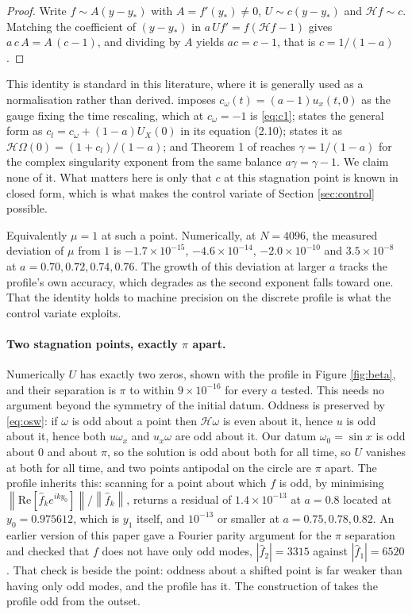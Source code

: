 \documentclass[11pt]{article}
\theoremstyle{definition}
\newcommand{\Hil}{\mathcal{H}}
\newcommand{\norm}[1]{\left\lVert #1 \right\rVert}
\newcommand{\abs}[1]{\left\lvert #1 \right\rvert}
\begin{document}
\begin{proof}
Write $f \sim A(y-y_\ast)$ with $A = f'(y_\ast)\ne 0$, $U \sim c(y-y_\ast)$ and
$\Hil f \sim c$. Matching the coefficient of $(y-y_\ast)$ in
$a\,Uf' = f(\Hil f - 1)$ gives $a\,c\,A = A\,(c-1)$, and dividing by $A$ yields
$ac = c-1$, that is $c=1/(1-a)$.
\end{proof}

This identity is standard in this literature, where it is generally used as a
normalisation rather than derived. \cite{chenS1} imposes
$c_\omega(t) = (a-1)u_x(t,0)$ as the gauge fixing the time rescaling, which at
$c_\omega=-1$ is \eqref{eq:c1}; \cite{htw2026} states the general form as
$c_l = c_\omega + (1-a)U_X(0)$ in its equation (2.10); \cite{xu2026} states it
as $\Hil\Omega(0)=(1+c_l)/(1-a)$; and Theorem 1 of \cite{lss2020} reaches
$\gamma = 1/(1-a)$ for the complex singularity exponent from the same balance
$a\gamma = \gamma-1$. We claim none of it. What matters here is only that $c$
at this stagnation point is known in closed form, which is what makes the
control variate of Section \ref{sec:control} possible.

Equivalently $\mu = 1$ at such a point. Numerically, at $N=4096$, the measured
deviation of $\mu$ from $1$ is $-1.7\times10^{-15}$, $-4.6\times10^{-14}$,
$-2.0\times10^{-10}$ and $3.5\times10^{-8}$ at $a=0.70,0.72,0.74,0.76$. The
growth of this deviation at larger $a$ tracks the profile's own accuracy, which
degrades as the second exponent falls toward one. That the identity holds to
machine precision on the discrete profile is what the control variate exploits.

\paragraph{Two stagnation points, exactly $\pi$ apart.} Numerically $U$ has
exactly two zeros, shown with the profile in Figure \ref{fig:beta}, and their
separation is $\pi$ to within $9\times10^{-16}$ for every $a$ tested. This
needs no argument beyond the symmetry of the initial datum. Oddness is
preserved by \eqref{eq:osw}: if $\omega$ is odd about a point then $\Hil\omega$
is even about it, hence $u$ is odd about it, hence both $u\omega_x$ and
$u_x\omega$ are odd about it. Our datum $\omega_0=\sin x$ is odd about $0$ and
about $\pi$, so the solution is odd about both for all time, so $U$ vanishes at
both for all time, and two points antipodal on the circle are $\pi$ apart. The
profile inherits this: scanning for a point about which $f$ is odd, by
minimising $\norm{\mathrm{Re}[\hat f_k e^{iky_0}]}/\norm{\hat f_k}$, returns a
residual of $1.4\times10^{-13}$ at $a=0.8$ located at $y_0=0.975612$, which is
$y_1$ itself, and $10^{-13}$ or smaller at $a=0.75,0.78,0.82$. An earlier
version of this paper gave a Fourier parity argument for the $\pi$ separation
and checked that $f$ does not have only odd modes, $\abs{\hat f_2}=3315$
against $\abs{\hat f_1}=6520$. That check is beside the point: oddness about a
shifted point is far weaker than having only odd modes, and the profile has it.
The construction of \cite{chenS1} takes the profile odd from the outset.
\end{document}
